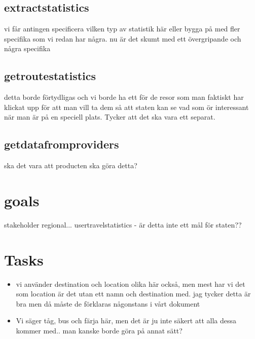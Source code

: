 \documentclass[a4paper]{article}
\begin{document}
	\subsection{extractstatistics}
vi får antingen specificera vilken typ av statistik  här eller bygga på med  fler specifika som vi redan har några. nu är det skumt med ett övergripande och några specifika
		
	\subsection{getroutestatistics}
	detta borde förtydligas och vi borde ha ett för de resor som man faktiskt har klickat upp för att man vill ta dem så att staten kan se vad som ör interessant när man är på en speciell plats. Tycker att det ska vara ett separat.
	
	\subsection{getdatafromproviders}
	ska det vara att producten ska göra detta?
	
\section{goals}
stakeholder regional... usertravelstatistics - är detta inte ett mål för staten??

\section{Tasks}

\begin{itemize}
	\item vi använder destination och location olika här också, men mest har vi det som location är det utan ett namn och destination med. jag tycker detta är bra men då måste de förklaras någonstans i vårt dokument

	\item Vi säger tåg, bus och färja här, men det är ju inte säkert att alla dessa kommer med.. man kanske borde göra på annat sätt?


\end{itemize}
\end{document}
